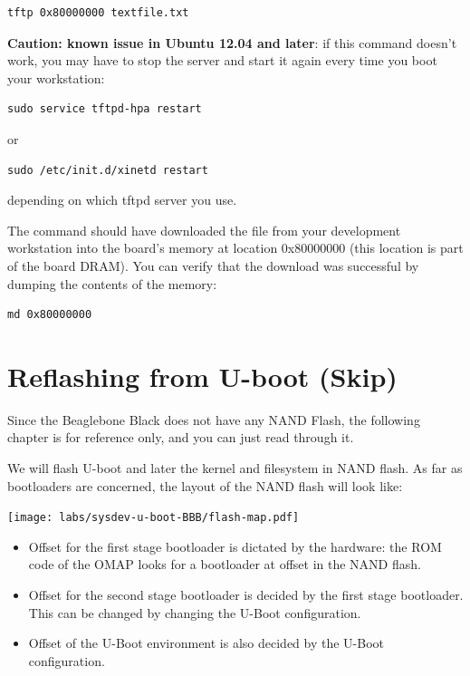 \begin{verbatim}
tftp 0x80000000 textfile.txt
\end{verbatim}

{\bf Caution: known issue in Ubuntu 12.04 and later}:
if this command doesn't work, you may have to stop the server
and start it again every time you boot your workstation:

\begin{verbatim}
sudo service tftpd-hpa restart
\end{verbatim}

or

\begin{verbatim}
sudo /etc/init.d/xinetd restart
\end{verbatim}

depending on which tftpd server you use.

The  command should have downloaded
the  file from your development
workstation into the board's memory at location 0x80000000 (this
location is part of the board DRAM). You can verify that the download
was successful by dumping the contents of the memory:

\begin{verbatim}
md 0x80000000
\end{verbatim}

\clearpage
\section{Reflashing from U-boot (Skip)}

Since the Beaglebone Black does not have any NAND Flash, the following
chapter is for reference only, and you can just read through it.

We will flash U-boot and later the kernel and filesystem in NAND
flash. As far as bootloaders are concerned, the layout of the NAND
flash will look like:

\begin{center}
  \texttt{[image: labs/sysdev-u-boot-BBB/flash-map.pdf]}
\end{center}

\begin{itemize}
\item Offset  for the first stage bootloader is dictated by
  the hardware: the ROM code of the OMAP looks for a bootloader at
  offset  in the NAND flash.
\item Offset  for the second stage bootloader is decided
  by the first stage bootloader. This can be changed by changing the
  U-Boot configuration.
\item Offset  of the U-Boot environment is also decided
  by the U-Boot configuration.
\end{itemize}

